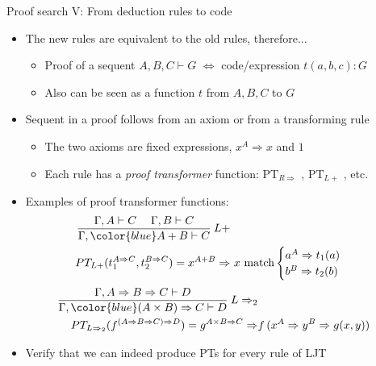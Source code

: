 \documentclass[english]{beamer}
\begin{document}
\begin{frame}{Proof search V: From deduction rules to code}

\begin{itemize}
\item The new rules are equivalent to the old rules, therefore...
\begin{itemize}
\item Proof of a sequent $A,B,C\vdash G$ $\Leftrightarrow$ code/expression
$t(a,b,c):G$
\item Also can be seen as a function $t$ from $A,B,C$ to $G$
\end{itemize}
\item Sequent in a proof follows from an axiom or from a transforming rule
\begin{itemize}
\item The two axioms are fixed expressions, $x^{A}\Rightarrow x$ and $1$
\item Each rule has a \emph{proof transformer} function: $\text{PT}_{R\Rightarrow}$
, $\text{PT}_{L+}$ , etc.
\end{itemize}
\item Examples of proof transformer functions:
\begin{align*}
\frac{\Gamma,A\vdash C\quad\;\Gamma,B\vdash C}{\Gamma,{\color{blue}A+B}\vdash C}\:L+\\
PT_{L+}(t_{1}^{A\Rightarrow C},t_{2}^{B\Rightarrow C})=x^{A+B}\Rightarrow & \ x\ \text{match}\begin{cases}
a^{A}\Rightarrow t_{1}(a)\\
b^{B}\Rightarrow t_{2}(b)
\end{cases}
\end{align*}
\begin{align*}
\frac{\Gamma,A\Rightarrow B\Rightarrow C\vdash D}{\Gamma,{\color{blue}(A\times B)\Rightarrow C}\vdash D}\:L\Rightarrow_{2}\\
PT_{L\Rightarrow_{2}}(f^{\left(A\Rightarrow B\Rightarrow C\right)\Rightarrow D})=g^{A\times B\Rightarrow C}\Rightarrow & f\,(x^{A}\Rightarrow y^{B}\Rightarrow g(x,y))
\end{align*}
\item Verify that we can indeed produce PTs for every rule of LJT
\end{itemize}
\end{frame}
\end{document}
